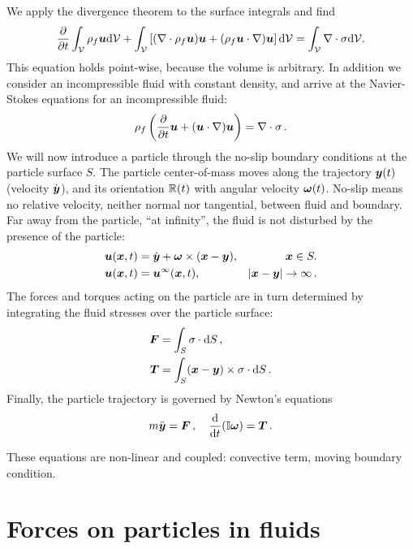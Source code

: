 \documentclass[thesis.tex]{subfiles}
\begin{document}
We apply the divergence theorem to the surface integrals and find
\begin{align}
    \frac{\partial }{\partial t}\int_\mathcal V  \rho_f \mbox{\boldmath$u$} \mathrm{d}\mathcal V +
    \int_\mathcal V  \left[(\nabla\cdot\rho_f\mbox{\boldmath$u$}) \mbox{\boldmath$u$}+(\rho_f\mbox{\boldmath$u$}\cdot\nabla) \mbox{\boldmath$u$}\right] \mathrm{d} \mathcal V =
    \int_\mathcal V \nabla\cdot\mathbb{\sigma} \mathrm{d} \mathcal V.
\end{align}
This equation holds point-wise, because the volume is arbitrary. In addition we consider an incompressible fluid with constant density, and arrive at the Navier-Stokes equations for an incompressible fluid:
\begin{align}
    \rho_f \left(\frac{\partial }{\partial t}\mbox{\boldmath$u$} + (\mbox{\boldmath$u$} \cdot \nabla) \mbox{\boldmath$u$}\right)=\nabla \cdot \mathbb{\sigma}\,.
\end{align}
We will now introduce a particle through the no-slip boundary conditions at the particle surface $S$. The particle center-of-mass moves along the trajectory $\mbox{\boldmath$y$}(t)$ (velocity $\dot{\mbox{\boldmath$y$}}$), and its orientation $\mathbb{R}(t)$ with angular velocity $\mbox{\boldmath$\omega$}(t)$. No-slip means no relative velocity, neither normal nor tangential, between fluid and boundary. Far away from the particle, ``at infinity'', the fluid is not disturbed by the presence of the particle:
\begin{align}
    \mbox{\boldmath$u$}(\mbox{\boldmath$x$}, t) &= \dot{\mbox{\boldmath$y$}} + \mbox{\boldmath$\omega$} \times (\mbox{\boldmath$x$} - \mbox{\boldmath$y$}), & \mbox{\boldmath$x$} \in S. \nonumber\\
    \mbox{\boldmath$u$}(\mbox{\boldmath$x$}, t) &= \mbox{\boldmath$u$}^\infty(\mbox{\boldmath$x$}, t), & |\mbox{\boldmath$x$}-\mbox{\boldmath$y$}|\to\infty\,.
\end{align}
The forces and torques acting on the particle are in turn determined by integrating the fluid stresses over the particle surface:
\begin{align}
    \mbox{\boldmath$F$} &= \int_S \mathbb{\sigma} \cdot \mathrm{d} S\,, \\
    \mbox{\boldmath$T$} &= \int_S (\mbox{\boldmath$x$} - \mbox{\boldmath$y$}) \times \mathbb{\sigma} \cdot \mathrm{d} S\,.
\end{align}
Finally, the particle trajectory is governed by Newton's equations
\begin{align}
    m\ddot{\mbox{\boldmath$y$}} = \mbox{\boldmath$F$}\,, \quad \frac{\mathrm{d} }{\mathrm{d} t}(\mathbb{I} \mbox{\boldmath$\omega$}) = \mbox{\boldmath$T$}\,.
\end{align}

These equations are non-linear and coupled: convective term, moving boundary condition.


\section{Forces on particles in fluids}\label{sec:forces}
\end{document}
